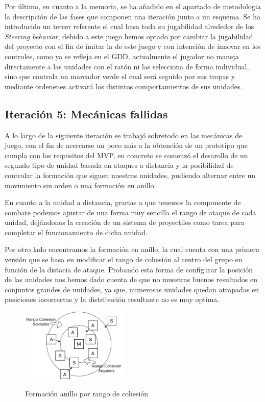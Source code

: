 Por último, en cuanto a la memoria, se ha añadido en el apartado de metodologia la
descripción de las fases que componen una iteración junto a un esquema. Se ha introducido
un tercer referente el cual basa toda su jugabilidad alrededor de los \textit{Steering
behavior}, debido a este juego hemos optado por cambiar la jugabilidad del proyecto
con el fin de imitar la de este juego y con intención de innovar en los controles, como ya se
refleja en el \ac{GDD}, actualmente el jugador no maneja directamente a las unidades con el
ratón ni las selecciona de forma individual, sino que controla un marcador verde el cual será
seguido por sus tropas y mediante ordenenes activará los distintos comportamientos de sus 
unidades. 

\subsection*{Iteración 5: Mecánicas fallidas}
A lo largo de la siguiente iteración se trabajó sobretodo en las mecánicas de juego, con el fin
de acercarse un poco más a la obtención de un prototipo que cumpla con los requisitos del \acs{MVP},
en concreto se comenzó el desarollo de un segundo tipo de unidad basada en ataques a distancia y 
la posibilidad de controlar la formación que siguen nuestras unidades, pudiendo alternar entre un
movimiento sin orden o una formación en anillo.

En cuanto a la unidad a distancia, gracias a que tenemos la componente de combate podemos ajustar de una
forma muy sencilla el rango de ataque de cada unidad, dejándonos la creación de un sistema de proyectiles
como tarea para completar el funcionamiento de dicha unidad. 

Por otro lado encontramos la formación en anillo, la cual cuenta con una primera versión que se basa en
modificar el rango de cohesión al centro del grupo en función de la distacia de ataque. Probando esta forma 
de configurar la posición de las unidades nos hemos dado cuenta de que no muestras buenos resultados en
conjuntos grandes de unidades, ya que, numerosas unidades quedan atrapadas en posiciones incorrectas y la
distribución resultante no es muy optima.

\begin{figure}[htb]
\centering
\includegraphics[width=0.45\textwidth]{imagenes/diario_desarrollo/anillo1.png}\\
\caption{Formación anillo por rango de cohesión}
\label{fig:anillo1}
\end{figure}

